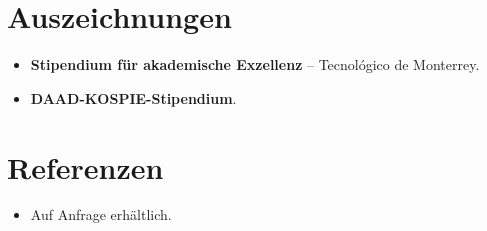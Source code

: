 \documentclass[11pt,a4paper,sans]{moderncv}
\begin{document}

\section{Auszeichnungen}
\vspace{1pt}
\begin{itemize}
\item{\textbf{Stipendium für akademische Exzellenz} -- Tecnológico de Monterrey.}
\item{\textbf{DAAD-KOSPIE-Stipendium}.}
\end{itemize}


\section{Referenzen}
\vspace{1pt}
\begin{itemize}
\item{Auf Anfrage erhältlich.}
\end{itemize}
\end{document}
